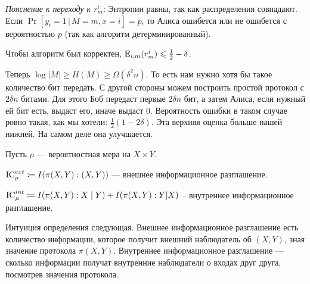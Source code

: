 \noindent\textit{Пояснение к переходу к  $ r_m^{i} $}:
Энтропии равны, так как распределения совпадают. Если $\Pr[y_i = 1 \, | \, M = m, x = i] = p$, то Алиса ошибется или не ошибется с вероятностью $p$ (так как алгоритм детерминированный).

Чтобы алгоритм был корректен, $ \mathbb{E}_{i, m} (r_m^{i}) \leqslant \frac{1}{2} - \delta $.

Теперь $ \log \lvert M \rvert  \ge H(M) \ge \Omega ( \delta ^2 n)$. 
То есть нам нужно хотя бы такое количество бит передать. С другой стороны можем построить простой протокол с $2\delta n$ битами. Для этого Боб передаст первые $2\delta n$ бит, а затем Алиса, если нужный ей бит есть, выдаст его, иначе выдаст 0. Вероятность ошибки в таком случае ровно такая, как мы хотели: $	\frac{1}{2} (1 - 2\delta )  $. Эта верхняя оценка больше нашей нижней. На самом деле она улучшается.


\dotfill

\begin{defn}
Пусть $  \mu$ --- вероятностная мера на $ X \times Y$. 

$ \operatorname{IC}_{\mu}^{ext} \coloneqq I( \pi(X, Y): (X, Y))$ --- внешнее информационное разглашение.

$ \operatorname{IC}_{\mu}^{int} \coloneqq I( \pi(X, Y) : X \mid Y) + I( \pi(X, Y) : Y | X) $ -- внутреннее информационное разглашение.
\end{defn}

Интуиция определения следующая. Внешнее информационное разглашение есть количество информации, которое получит внешний наблюдатель об $(X, Y)$, зная значение протокола $\pi(X, Y)$. Внутреннее информационное разглашение --- сколько информации получат внутренние наблюдатели о входах друг друга, посмотрев значения протокола.

